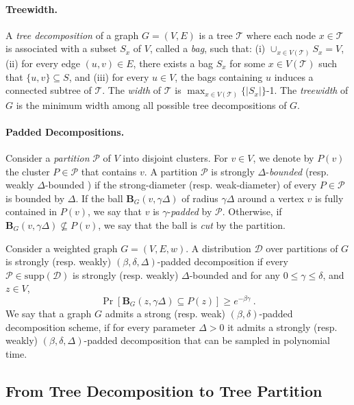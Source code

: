 \documentclass{theoretics}
\newcommand{\supp}{\mathrm{supp}}
\def\ball{\mathbf{B}}
\begin{document}
\paragraph*{Treewidth.} A \emph{tree decomposition} of a graph $G = (V,E)$ is a  tree $\mathcal{T}$ where each node $x\in \mathcal{T}$ is associated with a subset $S_x$ of $V$, called a \emph{bag}, such that: (i) $\cup_{x\in V(\mathcal{T})} S_x = V$, (ii) for every edge $(u,v) \in E$, there exists a bag $S_x$ for some $x\in V(\mathcal{T})$ such that $\{u,v\}\subseteq S$, and (iii) for every $u\in V$, the bags containing $u$ induces a connected subtree of $\mathcal{T}$. The \emph{width} of $\mathcal{T}$ is $\max_{x\in V(\mathcal{T})}\{|S_x|\}$-1. The \emph{treewidth} of $G$ is the minimum width among all possible tree decompositions of $G$. 


\paragraph*{Padded Decompositions.}
Consider a \emph{partition} $\mathcal{P}$ of $V$ into disjoint clusters.
For $v\in V$, we denote by $P(v)$ the cluster $P\in \mathcal{P}$ that contains $v$.
A partition $\mathcal{P}$ is strongly $\Delta$-\emph{bounded} (resp. weakly $\Delta$-bounded ) if the strong-diameter (resp. weak-diameter) of every $P\in\mathcal{P}$ is bounded by $\Delta$.
If the ball $\ball_G(v,\gamma\Delta)$ of radius $\gamma\Delta$ around a vertex $v$ is fully contained in $P(v)$, we say that $v$ is $\gamma$-{\em padded} by $\mathcal{P}$. Otherwise, if $\ball_G(v,\gamma\Delta)\not\subseteq P(v)$, we say that the ball is \emph{cut} by the partition.

\begin{definition}\label{def:PadDecompostion}
	Consider a weighted graph $G=\left(V,E,w\right)$.
	A distribution $\mathcal{D}$ over partitions of $G$ is strongly (resp. weakly) $(\beta,\delta,\Delta)$-padded decomposition if every $\mathcal{P}\in\supp(\mathcal{D})$ is strongly (resp. weakly) $\Delta$-bounded and for any $0\le\gamma\le\delta$, and $z\in V$,
	$$\Pr[\ball_G(z,\gamma\Delta)\subseteq P(z)] \ge e^{-\beta\gamma}~.$$
	We say that a graph $G$ admits a strong (resp. weak) $(\beta,\delta)$-padded decomposition scheme, if for every parameter $\Delta>0$ it admits a strongly (resp. weakly) $(\beta,\delta,\Delta)$-padded decomposition that can be sampled in polynomial time.  
\end{definition}


\subsection{From Tree Decomposition to Tree Partition} \label{sec:tree-partition}
\end{document}
